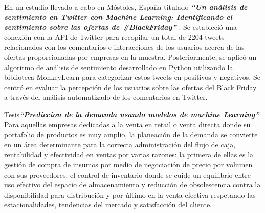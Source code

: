 


\vspace{1\baselineskip}
En un estudio llevado a cabo en Móstoles, España titulado \textbf{\textit{“Un análisis de sentimiento en Twitter con Machine Learning: Identificando el sentimiento sobre las ofertas de \#BlackFriday” }}\cite{saura2018analisis}. Se estableció una conexión con la API de Twitter para recopilar un total de 2204 tweets relacionados con los comentarios e interacciones de los usuarios acerca de las ofertas proporcionadas por empresas en la muestra. Posteriormente, se aplicó un algoritmo de análisis de sentimiento desarrollado en Python utilizando la biblioteca MonkeyLearn para categorizar estos tweets en positivos y negativos. Se centró en evaluar la percepción de los usuarios sobre las ofertas del Black Friday a través del análisis automatizado de los comentarios en Twitter.

\vspace{1\baselineskip}
Tesis\textbf{\textit{“Prediccion de la demanda usando modelos de machine Learning” }}\cite{hincapie2021prediccion} Para aquellas empresas dedicadas a la venta en retail o venta directa donde su portafolio de productos es muy amplio, la planeación de la demanda se convierte en un área determinante para la correcta administración del flujo de caja, rentabilidad y efectividad en ventas por varias razones: la primera de ellas es la gestión de compra de insumos por medio de negociación de precio por volumen con sus proveedores; el control de inventario donde se cuide un equilibrio entre uso efectivo del espacio de almacenamiento y reducción de obsolescencia contra la disponibilidad para distribución y por último en la venta efectiva respetando las estacionalidades, tendencias del mercado y satisfacción del cliente.

